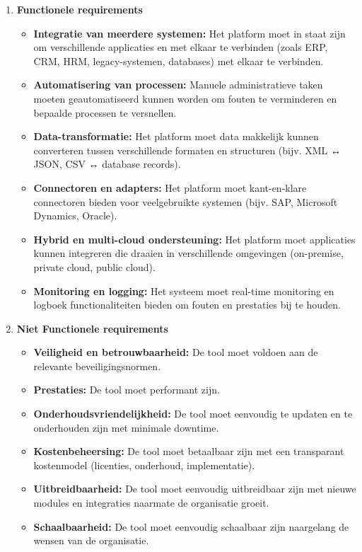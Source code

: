 \begin{enumerate}
    \item \textbf{Functionele requirements}
    \begin{itemize}
        \item \textbf{Integratie van meerdere systemen:} Het platform moet in staat zijn om verschillende applicaties en met elkaar te verbinden (zoals ERP, CRM, HRM, legacy-systemen, databases) met elkaar te verbinden.
        \item \textbf{Automatisering van processen:} Manuele administratieve taken moeten geautomatiseerd kunnen worden om fouten te verminderen en bepaalde processen te versnellen.
        \item \textbf{Data-transformatie:} Het platform moet data makkelijk kunnen converteren tussen verschillende formaten en structuren (bijv. XML ↔ JSON, CSV ↔ database records).
        \item \textbf{Connectoren en adapters:} Het platform moet kant-en-klare connectoren bieden voor veelgebruikte systemen (bijv. SAP, Microsoft Dynamics, Oracle).
        \item \textbf{Hybrid en multi-cloud ondersteuning:} Het platform moet applicaties kunnen integreren die draaien in verschillende omgevingen (on-premise, private cloud, public cloud).
        \item \textbf{Monitoring en logging:} Het systeem moet real-time monitoring en logboek functionaliteiten bieden om fouten en prestaties bij te houden.
    \end{itemize}

    \item \textbf{Niet Functionele requirements}
    \begin{itemize}
        \item \textbf{Veiligheid en betrouwbaarheid:} De tool moet voldoen aan de relevante beveiligingsnormen.
        \item \textbf{Prestaties:} De tool moet performant zijn.
        \item \textbf{Onderhoudsvriendelijkheid:} De tool moet eenvoudig te updaten en te onderhouden zijn met minimale downtime.
        \item \textbf{Kostenbeheersing:} De tool moet betaalbaar zijn met een transparant kostenmodel (licenties, onderhoud, implementatie).
        \item \textbf{Uitbreidbaarheid:} De tool moet eenvoudig uitbreidbaar zijn met nieuwe modules en integraties naarmate de organisatie groeit.
        \item \textbf{Schaalbaarheid:} De tool moet eenvoudig schaalbaar zijn naargelang de wensen van de organisatie.
    \end{itemize}
\end{enumerate}

